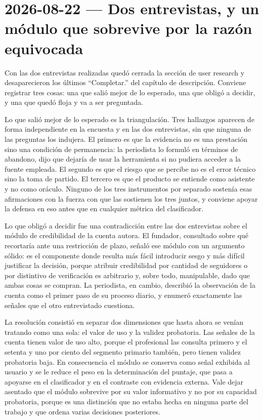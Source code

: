 \section{2026-08-22 — Dos entrevistas, y un módulo que sobrevive por la razón equivocada}

Con las dos entrevistas realizadas quedó cerrada la sección de user research y desaparecieron los últimos \enquote{Completar.} del capítulo de descripción. Conviene registrar tres cosas: una que salió mejor de lo esperado, una que obligó a decidir, y una que quedó floja y va a ser preguntada.

Lo que salió mejor de lo esperado es la triangulación. Tres hallazgos aparecen de forma independiente en la encuesta y en las dos entrevistas, sin que ninguna de las preguntas los indujera. El primero es que la evidencia no es una prestación sino una condición de permanencia: la periodista lo formuló en términos de abandono, dijo que dejaría de usar la herramienta si no pudiera acceder a la fuente empleada. El segundo es que el riesgo que se percibe no es el error técnico sino la toma de partido. El tercero es que el producto se entiende como asistente y no como oráculo. Ninguno de los tres instrumentos por separado sostenía esas afirmaciones con la fuerza con que las sostienen los tres juntos, y conviene apoyar la defensa en eso antes que en cualquier métrica del clasificador.

Lo que obligó a decidir fue una contradicción entre las dos entrevistas sobre el módulo de credibilidad de la cuenta autora. El fundador, consultado sobre qué recortaría ante una restricción de plazo, señaló ese módulo con un argumento sólido: es el componente donde resulta más fácil introducir sesgo y más difícil justificar la decisión, porque atribuir credibilidad por cantidad de seguidores o por distintivo de verificación es arbitrario y, sobre todo, manipulable, dado que ambas cosas se compran. La periodista, en cambio, describió la observación de la cuenta como el primer paso de su proceso diario, y enumeró exactamente las señales que el otro entrevistado cuestiona.

La resolución consistió en separar dos dimensiones que hasta ahora se venían tratando como una sola: el valor de uso y la validez probatoria. Las señales de la cuenta tienen valor de uso alto, porque el profesional las consulta primero y el setenta y uno por ciento del segmento primario también, pero tienen validez probatoria baja. En consecuencia el módulo se conserva como señal exhibida al usuario y se le reduce el peso en la determinación del puntaje, que pasa a apoyarse en el clasificador y en el contraste con evidencia externa. Vale dejar asentado que el módulo sobrevive por su valor informativo y no por su capacidad probatoria, porque es una distinción que no estaba hecha en ninguna parte del trabajo y que ordena varias decisiones posteriores.

